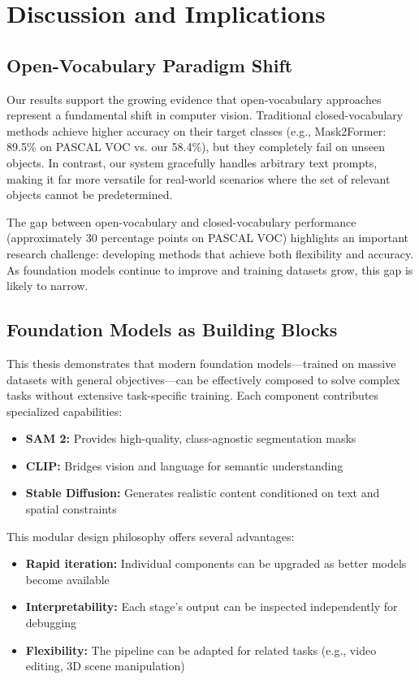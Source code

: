 \section{Discussion and Implications}

\subsection{Open-Vocabulary Paradigm Shift}

Our results support the growing evidence that open-vocabulary approaches represent a fundamental shift in computer vision. Traditional closed-vocabulary methods achieve higher accuracy on their target classes (e.g., Mask2Former: 89.5\% on PASCAL VOC vs. our 58.4\%), but they completely fail on unseen objects. In contrast, our system gracefully handles arbitrary text prompts, making it far more versatile for real-world scenarios where the set of relevant objects cannot be predetermined.

The gap between open-vocabulary and closed-vocabulary performance (approximately 30 percentage points on PASCAL VOC) highlights an important research challenge: developing methods that achieve both flexibility and accuracy. As foundation models continue to improve and training datasets grow, this gap is likely to narrow.

\subsection{Foundation Models as Building Blocks}

This thesis demonstrates that modern foundation models—trained on massive datasets with general objectives—can be effectively composed to solve complex tasks without extensive task-specific training. Each component contributes specialized capabilities:

\begin{itemize}
    \item \textbf{SAM 2:} Provides high-quality, class-agnostic segmentation masks
    \item \textbf{CLIP:} Bridges vision and language for semantic understanding
    \item \textbf{Stable Diffusion:} Generates realistic content conditioned on text and spatial constraints
\end{itemize}

This modular design philosophy offers several advantages:
\begin{itemize}
    \item \textbf{Rapid iteration:} Individual components can be upgraded as better models become available
    \item \textbf{Interpretability:} Each stage's output can be inspected independently for debugging
    \item \textbf{Flexibility:} The pipeline can be adapted for related tasks (e.g., video editing, 3D scene manipulation)
\end{itemize}

